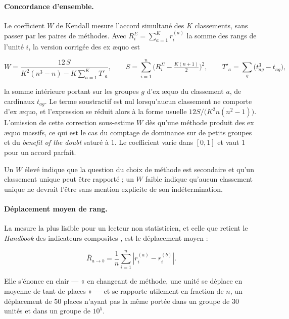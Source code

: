 \documentclass[11pt,a4paper]{article}
\theoremstyle{definition}
\theoremstyle{remark}
\newcommand{\abs}[1]{\left\lvert #1 \right\rvert}
\begin{document}
\bigskip

\paragraph{Concordance d'ensemble.} Le coefficient $W$ de Kendall mesure l'accord simultané
des $K$ classements, sans passer par les paires de méthodes. Avec
$R^{\Sigma}_i = \sum_{a=1}^{K} r^{(a)}_i$ la somme des rangs de l'unité $i$, la version
corrigée des ex \ae quo est

\medskip

\[
  W = \frac{12\,S}{K^2(n^3-n) - K\sum_{a=1}^{K} T'_a},
  \qquad
  S = \sum_{i=1}^{n} \Big(R^{\Sigma}_i - \tfrac{K(n+1)}{2}\Big)^2,
  \qquad
  T'_a = \sum_{g} \big(t_{ag}^3 - t_{ag}\big),
\]

\bigskip

la somme intérieure portant sur les groupes $g$ d'ex \ae quo du classement $a$, de
cardinaux $t_{ag}$. Le terme soustractif est nul lorsqu'aucun classement ne comporte
d'ex \ae quo, et l'expression se réduit alors à la forme usuelle
$12S / \big(K^2 n(n^2-1)\big)$. L'omission de cette correction sous-estime $W$ dès qu'une
méthode produit des ex \ae quo massifs, ce qui est le cas du comptage de dominance sur de
petits groupes et du \emph{benefit of the doubt} saturé à $1$. Le coefficient varie dans
$[0,1]$ et vaut $1$ pour un accord parfait.

\medskip

Un $W$ élevé indique que la question du choix de méthode est secondaire et qu'un classement
unique peut être rapporté ; un $W$ faible indique qu'aucun classement unique ne devrait
l'être sans mention explicite de son indétermination.

\bigskip

\paragraph{Déplacement moyen de rang.} La mesure la plus lisible pour un lecteur non
statisticien, et celle que retient le \emph{Handbook} des indicateurs composites
\citep{nardo2008}, est le déplacement moyen :

\medskip

\[
  \bar{R}_{a\to b} = \frac{1}{n}\sum_{i=1}^{n} \abs{r^{(a)}_i - r^{(b)}_i}.
\]

\bigskip

Elle s'énonce en clair --- « en changeant de méthode, une unité se déplace en moyenne de
tant de places » --- et se rapporte utilement en fraction de $n$, un déplacement de
$50$ places n'ayant pas la même portée dans un groupe de $30$ unités et dans un groupe de
$10^5$.
\end{document}
